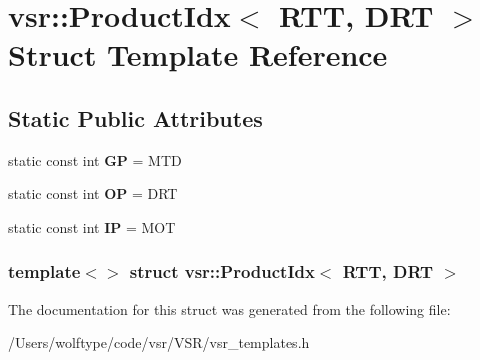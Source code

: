 \hypertarget{structvsr_1_1_product_idx_3_01_r_t_t_00_01_d_r_t_01_4}{\section{vsr\-:\-:Product\-Idx$<$ R\-T\-T, D\-R\-T $>$ Struct Template Reference}
\label{structvsr_1_1_product_idx_3_01_r_t_t_00_01_d_r_t_01_4}
}
\subsection*{Static Public Attributes}
\begin{DoxyCompactItemize}
\item 
\hypertarget{structvsr_1_1_product_idx_3_01_r_t_t_00_01_d_r_t_01_4_aed0aaac29c549436a200ede0dc7b7780}{static const int {\bfseries G\-P} = M\-T\-D}\label{structvsr_1_1_product_idx_3_01_r_t_t_00_01_d_r_t_01_4_aed0aaac29c549436a200ede0dc7b7780}

\item 
\hypertarget{structvsr_1_1_product_idx_3_01_r_t_t_00_01_d_r_t_01_4_ad5f4fa611e6fba6d9e2035e0f1233640}{static const int {\bfseries O\-P} = D\-R\-T}\label{structvsr_1_1_product_idx_3_01_r_t_t_00_01_d_r_t_01_4_ad5f4fa611e6fba6d9e2035e0f1233640}

\item 
\hypertarget{structvsr_1_1_product_idx_3_01_r_t_t_00_01_d_r_t_01_4_a0a650e9c4cb7633dfae97d804d4bef57}{static const int {\bfseries I\-P} = M\-O\-T}\label{structvsr_1_1_product_idx_3_01_r_t_t_00_01_d_r_t_01_4_a0a650e9c4cb7633dfae97d804d4bef57}

\end{DoxyCompactItemize}
\subsubsection*{template$<$$>$ struct vsr\-::\-Product\-Idx$<$ R\-T\-T, D\-R\-T $>$}



The documentation for this struct was generated from the following file\-:\begin{DoxyCompactItemize}
\item 
/\-Users/wolftype/code/vsr/\-V\-S\-R/vsr\-\_\-templates.\-h\end{DoxyCompactItemize}
